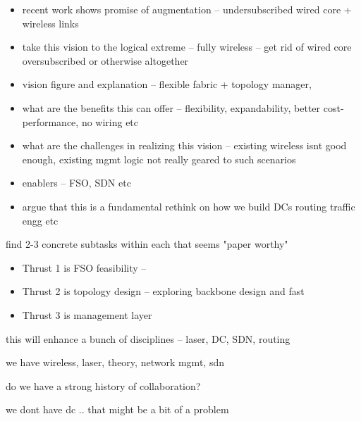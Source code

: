 \begin{itemize}




\item recent work shows promise of augmentation  -- undersubscribed wired core + wireless links

\item take this vision to the logical extreme  --  fully wireless -- get rid of wired core oversubscribed or otherwise altogether 

\item  vision figure and explanation  --  flexible fabric +  topology manager,  

\item  what are the benefits this can offer -- flexibility, expandability, better cost-performance, no wiring etc

\item what are the challenges in realizing this vision -- existing wireless isnt good enough, existing mgmt logic not really geared to such scenarios 

\item enablers -- FSO, SDN etc  

\item argue that this is a fundamental rethink on how we build DCs routing traffic engg etc

\end{itemize}


  find 2-3 concrete subtasks within each that seems "paper worthy"
\begin{itemize}
\item Thrust 1 is FSO feasibility -- 
\item Thrust 2 is topology design  -- exploring backbone design and fast 
\item Thrust 3 is management layer 
\end{itemize}

this will enhance a bunch of disciplines -- laser, DC, SDN, routing 

 we have wireless, laser, theory, network mgmt, sdn

do we have a strong history of collaboration?

 we dont have dc .. that might be a bit of a problem

